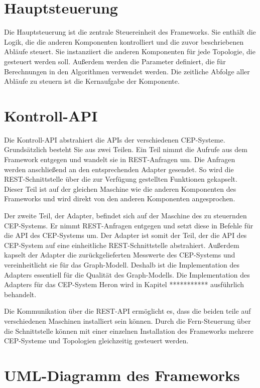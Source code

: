 \section{Hauptsteuerung}

Die Hauptsteuerung ist die zentrale Steuereinheit des Frameworks.
Sie enthält die Logik, die die anderen Komponenten kontrolliert und die zuvor beschriebenen Abläufe steuert.
Sie instanziiert die anderen Komponenten für jede Topologie, die gesteuert werden soll.
Außerdem werden die Parameter definiert, die für Berechnungen in den Algorithmen verwendet werden.
Die zeitliche Abfolge aller Abläufe zu steuern ist die Kernaufgabe der Komponente.

\section{Kontroll-API}

Die Kontroll-API abstrahiert die APIs der verschiedenen CEP-Systeme.
Grundsätzlich besteht Sie aus zwei Teilen.
Ein Teil nimmt die Aufrufe aus dem Framework entgegen und wandelt sie in REST-Anfragen um.
Die Anfragen werden anschließend an den entsprechenden Adapter gesendet.
So wird die REST-Schnittstelle über die zur Verfügung gestellten Funktionen gekapselt.
Dieser Teil ist auf der gleichen Maschine wie die anderen Komponenten des Frameworks und wird direkt von den anderen Komponenten angesprochen.

Der zweite Teil, der Adapter, befindet sich auf der Maschine des zu steuernden CEP-Systems.
Er nimmt REST-Anfragen entgegen und setzt diese in Befehle für die API des CEP-Systems um.
Der Adapter ist somit der Teil, der die API des CEP-System auf eine einheitliche REST-Schnittstelle abstrahiert.
Außerdem kapselt der Adapter die zurückgelieferten Messwerte des CEP-Systems und vereinheitlicht sie für das Graph-Modell.
Deshalb ist die Implementation des Adapters essentiell für die Qualität des Graph-Modells.
Die Implementation des Adapters für das CEP-System Heron wird in Kapitel *********** ausführlich behandelt.

Die Kommunikation über die REST-API ermöglicht es, dass die beiden teile auf verschiedenen Maschinen installiert sein können.
Durch die Fern-Steuerung über die Schnittstelle können mit einer einzelnen Installation des Frameworks mehrere CEP-Systeme und Topologien gleichzeitig gesteuert werden.

\section{UML-Diagramm des Frameworks}



















